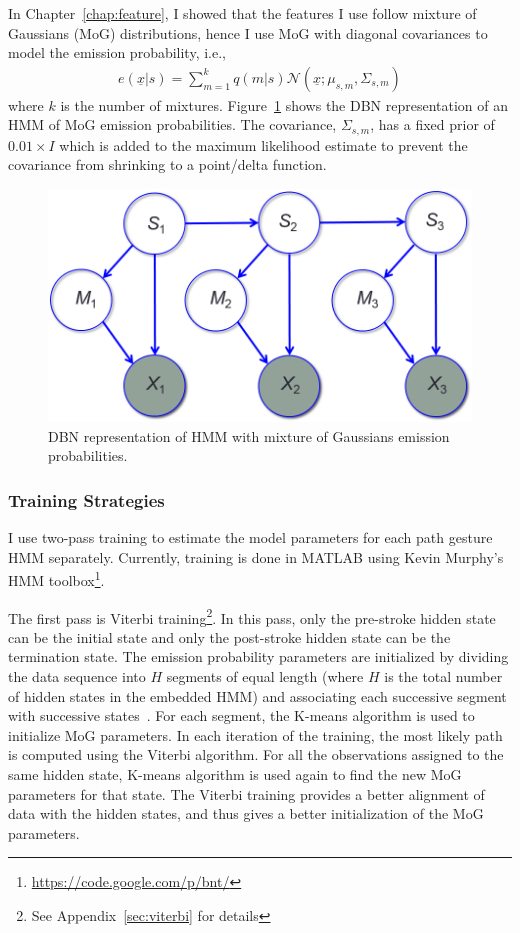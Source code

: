 In Chapter~\ref{chap:feature}, I showed that the features I use follow mixture
of Gaussians (MoG) distributions, hence I use MoG with diagonal covariances to
model the emission probability, i.e.,
\begin{align}
e(\underline{x} | s) = \sum_{m=1}^k q(m | s)\mathcal{N}(\underline{x};
\mu_{s,m}, \Sigma_{s, m})
\end{align}
where $k$ is the number of mixtures.
Figure~\ref{fig:mog} shows the DBN representation of an HMM of MoG emission
probabilities. The covariance, $\Sigma_{s, m}$, has a fixed prior of $0.01\times
I$ which is added to the maximum likelihood estimate to prevent the covariance from shrinking to a point/delta function. 

\begin{figure}[tbh]
\centering
\includegraphics[width=0.5\columnwidth]{figures/mog.png}
\caption{DBN representation of HMM with mixture of
Gaussians emission probabilities.}
\label{fig:mog}
\end{figure}

\subsubsection{Training Strategies}
I use two-pass training to estimate the model parameters for each path
gesture HMM separately. Currently, training is done in MATLAB using Kevin
Murphy's HMM toolbox\footnote{\url{https://code.google.com/p/bnt/}}.

The first pass is Viterbi training\footnote{See Appendix~\ref{sec:viterbi} for
details}.
In this pass, only the pre-stroke hidden state can be the initial state and
only the post-stroke hidden state can be the termination
state. The emission probability parameters are initialized by dividing the data
sequence into $H$ segments of equal length (where $H$ is the total number of
hidden states in the embedded HMM) and associating each successive segment with
successive states~\cite{young1994}. For each segment, the K-means algorithm is used to initialize MoG parameters. In each iteration of the training, the most likely path is computed using the
Viterbi algorithm. For all the observations assigned to the same hidden
state, K-means algorithm is used again to find the new MoG parameters for
that state. The Viterbi training provides a better alignment of data with the
hidden states, and thus gives a better initialization of the MoG parameters. 

